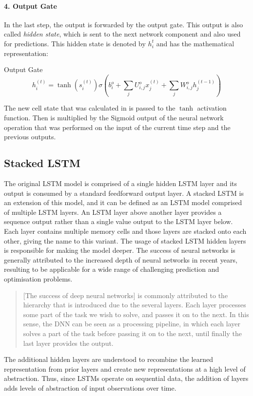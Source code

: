         \paragraph{4. Output Gate}

            In the last step, the output is forwarded by the output gate. This output is also called \emph{hidden state}, which is sent to the next network component and also used for predictions.
            This hidden state is denoted by $h_i^t$ and has the mathematical representation:

            \begin{pabox}{Output Gate}
                $$h_i^{(t)} = \tanh \left(s_i^{(t)}\right) \sigma \left(b_i^o + \sum_{j} U_{i, j}^o x_j^{(t)} + \sum_j W_{i, j}^o h_j^{(t - 1)}\right)$$
            \end{pabox}
            The new cell state that was calculated in  is passed to the $\tanh$ activation function. Then is multiplied by the Sigmoid output of the neural network operation that was performed on the input of the current time step and the previous outputs.

    \subsection{Stacked LSTM}
    \label{sec:stacked-lstm}

        The original LSTM model is comprised of a single hidden LSTM layer and its output is consumed by a standard feedforward output layer.
        A stacked LSTM is an extension of this model, and it can be defined as an LSTM model comprised of multiple LSTM layers.
        An LSTM layer above another layer provides a sequence output rather than a single value output to the LSTM layer below. Each layer contains multiple memory cells and those layers are stacked onto each other, giving the name to this variant.
        The usage of stacked LSTM hidden layers is responsible for making the model deeper.
        The success of neural networks is generally attributed to the increased depth of neural networks in recent years, resulting to be applicable for a wide range of challenging prediction and optimisation problems.

        \begin{quote}
            [The success of deep neural networks] is commonly attributed to the hierarchy that is introduced due to the several layers.
            Each layer processes some part of the task we wish to solve, and passes it on to the next.
            In this sense, the DNN can be seen as a processing pipeline, in which each layer solves a part of the task before passing it on to the next, until finally the last layer provides the output. \cite{hermansTrainingAnalysingDeep2013}
        \end{quote}
        The additional hidden layers are understood to recombine the learned representation from prior layers and create new representations at a high level of abstraction.
        Thus, since LSTMs operate on sequential data, the addition of layers adds levels of abstraction of input observations over time.

